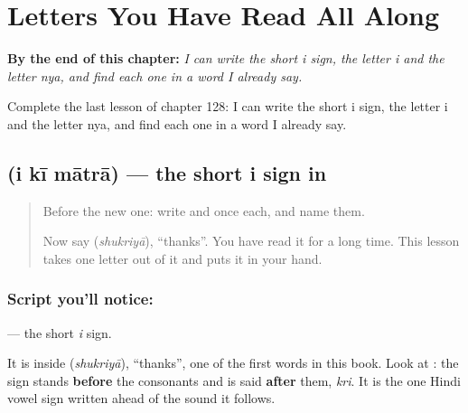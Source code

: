 
\chapter{Letters You Have Read All Along}
\label{ch:hi-letters-read-all-along}

\begin{chapteropening}
\textbf{By the end of this chapter:} \emph{I can write the short i sign, the letter i and the letter nya, and find each one in a word I already say.}

Complete the last lesson of chapter 128: I can write the short i sign, the letter i and the letter nya, and find each one in a word I already say.
\end{chapteropening}

\section[\texorpdfstring{\hi{ि} (i kī mātrā)}{ि (i kī mātrā)}]{ (i kī mātrā) — the short i sign in }

\label{lesson:HI-W128-vowel-sign-i}



\begin{quote}
Before the new one: write  and  once each, and name them.

Now say \textbf{} (\emph{shukriyā}), \textquotedblleft{}thanks\textquotedblright{}. You have read it for a long time. This lesson takes one letter out of it and puts it in your hand.
\end{quote}

\subsection*{Script you'll notice: }
\textbf{} — the short \emph{i} sign.

It is inside \textbf{} (\emph{shukriyā}), \textquotedblleft{}thanks\textquotedblright{}, one of the first words in this book. Look at \textbf{}: the sign stands \textbf{before} the consonants and is said \textbf{after} them, \emph{kri}. It is the one Hindi vowel sign written ahead of the sound it follows.


